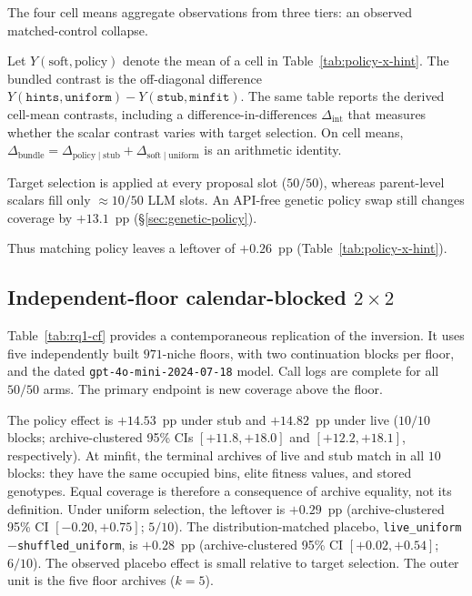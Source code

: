 \documentclass[preprint,12pt]{elsarticle}
\begin{document}
The four cell means aggregate observations from three tiers: an observed matched-control collapse.

Let $Y(\mathrm{soft},\mathrm{policy})$ denote the mean of a cell in Table~\ref{tab:policy-x-hint}. The bundled contrast is the off-diagonal difference $Y(\texttt{hints},\texttt{uniform})-Y(\texttt{stub},\texttt{minfit})$. The same table reports the derived cell-mean contrasts, including a difference-in-differences $\Delta_{\mathrm{int}}$ that measures whether the scalar contrast varies with target selection. On cell means, $\Delta_{\mathrm{bundle}}=\Delta_{\mathrm{policy}\mid\mathrm{stub}}+\Delta_{\mathrm{soft}\mid\mathrm{uniform}}$ is an arithmetic identity.

Target selection is applied at every proposal slot ($50/50$), whereas parent-level scalars fill only ${\approx}10/50$ LLM slots. An API-free genetic policy swap still changes coverage by $+13.1$~pp (\S\ref{sec:genetic-policy}).

Thus matching policy leaves a leftover of $+0.26$~pp (Table~\ref{tab:policy-x-hint}).

\subsection{Independent-floor calendar-blocked $2\times2$}
\label{sec:rq1-cf}

Table~\ref{tab:rq1-cf} provides a contemporaneous replication of the inversion. It uses five independently built $971$-niche floors, with two continuation blocks per floor, and the dated \texttt{gpt-4o-mini-2024-07-18} model. Call logs are complete for all $50/50$ arms. The primary endpoint is new coverage above the floor.

The policy effect is $+14.53$~pp under stub and $+14.82$~pp under live ($10/10$ blocks; archive-clustered 95\% CIs $[+11.8,+18.0]$ and $[+12.2,+18.1]$, respectively). At minfit, the terminal archives of live and stub match in all $10$ blocks: they have the same occupied bins, elite fitness values, and stored genotypes. Equal coverage is therefore a consequence of archive equality, not its definition. Under uniform selection, the leftover is $+0.29$~pp (archive-clustered 95\% CI $[-0.20,+0.75]$; $5/10$). The distribution-matched placebo, \texttt{live\_uniform}$-$\texttt{shuffled\_uniform}, is $+0.28$~pp (archive-clustered 95\% CI $[+0.02,+0.54]$; $6/10$). The observed placebo effect is small relative to target selection. The outer unit is the five floor archives ($k{=}5$).
\end{document}
